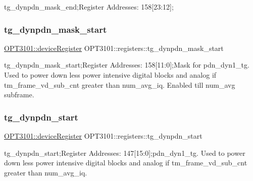 tg\+\_\+dynpdn\+\_\+mask\+\_\+end;Register Addresses\+: 158\mbox{[}23\+:12\mbox{]}; 

\mbox{\label{class_o_p_t3101_1_1registers_a56cd0f8b97af20f554e11b34982aba81}} 
\subsubsection{\texorpdfstring{tg\+\_\+dynpdn\+\_\+mask\+\_\+start}{tg\_dynpdn\_mask\_start}}
{\footnotesize\ttfamily \mbox{\hyperlink{class_o_p_t3101_1_1device_register}{O\+P\+T3101\+::device\+Register}} O\+P\+T3101\+::registers\+::tg\+\_\+dynpdn\+\_\+mask\+\_\+start}



tg\+\_\+dynpdn\+\_\+mask\+\_\+start;Register Addresses\+: 158\mbox{[}11\+:0\mbox{]};Mask for pdn\+\_\+dyn1\+\_\+tg. Used to power down less power intensive digital blocks and analog if tm\+\_\+frame\+\_\+vd\+\_\+sub\+\_\+cnt greater than num\+\_\+avg\+\_\+iq. Enabled till num\+\_\+avg subframe. 

\mbox{\label{class_o_p_t3101_1_1registers_a8e552798736ae98ba96bc672fc5f46d4}} 
\subsubsection{\texorpdfstring{tg\+\_\+dynpdn\+\_\+start}{tg\_dynpdn\_start}}
{\footnotesize\ttfamily \mbox{\hyperlink{class_o_p_t3101_1_1device_register}{O\+P\+T3101\+::device\+Register}} O\+P\+T3101\+::registers\+::tg\+\_\+dynpdn\+\_\+start}



tg\+\_\+dynpdn\+\_\+start;Register Addresses\+: 147\mbox{[}15\+:0\mbox{]};pdn\+\_\+dyn1\+\_\+tg. Used to power down less power intensive digital blocks and analog if tm\+\_\+frame\+\_\+vd\+\_\+sub\+\_\+cnt greater than num\+\_\+avg\+\_\+iq. 

\mbox{\label{class_o_p_t3101_1_1registers_a89a7d424e929b98a2ebde2007943a84b}} 
